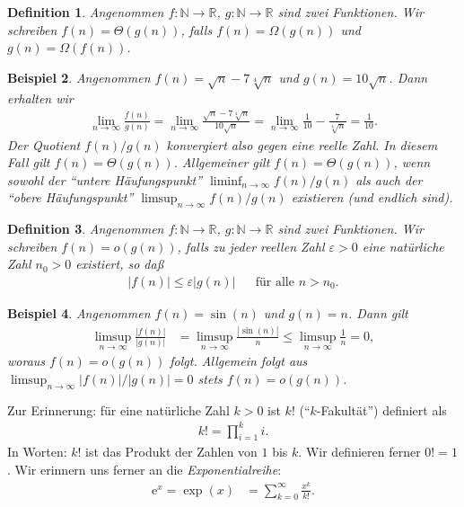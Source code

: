 \documentclass[10pt,reqno]{amsart}
\numberwithin{equation}{section}
\newcommand\NN{\mathbb N}
\newcommand\RR{\mathbb R}
\newtheorem{definition}{Definition}[section]
\newtheorem{example}[definition]{Beispiel}
\newcommand\eul{\mathrm{e}}
\newcommand\eps{\varepsilon}
\begin{document}
\begin{definition}\label{def_Theta}
	Angenommen $f:\NN\to\RR$, $g:\NN\to\RR$ sind zwei Funktionen.
	Wir schreiben $f(n)=\Theta(g(n))$, falls $f(n)=\Omega(g(n))$ und $g(n)=\Omega(f(n))$.
\end{definition}

\begin{example}\upshape
	Angenommen $f(n)=\sqrt n-7\sqrt[4]n$ und $g(n)=10\sqrt n$.
Dann erhalten wir
\begin{align*}
	\lim_{n\to\infty}\frac{f(n)}{g(n)}=\lim_{n\to\infty}\frac{\sqrt n-7\sqrt[4]n}{10\sqrt n}=\lim_{n\to\infty}\frac1{10}-\frac7{\sqrt[4]n}=\frac1{10}.
\end{align*}
Der Quotient $f(n)/g(n)$ konvergiert also gegen eine reelle Zahl.
In diesem Fall gilt $f(n)=\Theta(g(n))$.
Allgemeiner gilt $f(n)=\Theta(g(n))$, wenn sowohl der ``untere H\"aufungspunkt'' $\liminf_{n\to\infty}f(n)/g(n)$ als auch der ``obere H\"aufungspunkt'' $\limsup_{n\to\infty}f(n)/g(n)$ existieren (und endlich sind).
\end{example}

\begin{definition}\label{def_o}
	Angenommen $f:\NN\to\RR$, $g:\NN\to\RR$ sind zwei Funktionen.
	Wir schreiben $f(n)=o(g(n))$, falls zu jeder reellen Zahl $\eps>0$ eine nat\"urliche Zahl $n_0>0$ existiert, so da\ss\
	\begin{align*}|f(n)|\leq\eps|g(n)|&&\mbox{f\"ur alle }n>n_0.\end{align*}
\end{definition}

\begin{example}\upshape
	Angenommen $f(n)=\sin(n)$ und $g(n)=n$.
	Dann gilt
	\begin{align*}
		\limsup_{n\to\infty}\frac{|f(n)|}{|g(n)|}&=\limsup_{n\to\infty}\frac{|\sin(n)|}{n}\leq\limsup_{n\to\infty}\frac1n=0,
	\end{align*}
	woraus $f(n)=o(g(n))$ folgt.
	Allgemein folgt aus $\limsup_{n\to\infty}|f(n)|/|g(n)|=0$ stets $f(n)=o(g(n))$.
\end{example}

Zur Erinnerung: f\"ur eine nat\"urliche Zahl $k>0$ ist $k!$ (``$k$-Fakult\"at'') definiert als
\begin{align*}
	k!=\prod_{i=1}^ki.
\end{align*}
In Worten: $k!$ ist das Produkt der Zahlen von $1$ bis $k$.
Wir definieren ferner $0!=1$.
Wir erinnern uns ferner an die {\em Exponentialreihe}:
\begin{align*}
	\eul^x=\exp(x)&=\sum_{k=0}^\infty\frac{x^k}{k!}.
\end{align*}
\end{document}
